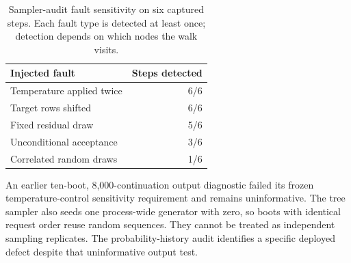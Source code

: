 \begin{table}[t]
\caption{Sampler-audit fault sensitivity on six captured steps. Each fault type is detected at least once; detection depends on which nodes the walk visits.}
\label{tab:sampling-faults}
\centering\small
\begin{tabular}{@{}lr@{}}
\toprule
Injected fault & Steps detected \\
\midrule
Temperature applied twice & 6/6 \\
Target rows shifted & 6/6 \\
Fixed residual draw & 5/6 \\
Unconditional acceptance & 3/6 \\
Correlated random draws & 1/6 \\
\bottomrule
\end{tabular}
\end{table}

An earlier ten-boot, 8,000-continuation output diagnostic failed its frozen temperature-control sensitivity requirement and remains uninformative. The tree sampler also seeds one process-wide generator with zero, so boots with identical request order reuse random sequences. They cannot be treated as independent sampling replicates. The probability-history audit identifies a specific deployed defect despite that uninformative output test.
